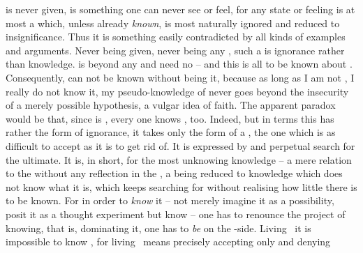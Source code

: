  is never given,  is something one can never see or feel, for
any  state or feeling is at most a  which, unless already
{\em known}, is most naturally ignored and reduced to insignificance. Thus
it is something easily contradicted by all kinds of  examples and
arguments.
Never being given, never being any  , such a  is
ignorance rather than knowledge.     is
beyond any  and need no  -- and this is all to be known
about . Consequently,  can not be known without being it,
because as long as I am not , I really do not know it, my 
pseudo-knowledge of  never goes beyond the insecurity of a merely
possible hypothesis, a vulgar idea of faith. The apparent paradox would be that,
since  is , every one knows , too.
Indeed, but in  terms this  has rather the
form of ignorance, it takes only the form of a ,
the one which is as difficult to accept as it is to get rid of. It is expressed
by  and perpetual search for the ultimate. It is, in short, for the
most unknowing knowledge -- a mere relation to the  without any
reflection in the , a being reduced to knowledge which does not
know what it is, which keeps searching for  without realising how
little there is to be known. For in order to {\em know} it -- not merely imagine
it as a possibility, posit it as a thought experiment but  know --
one has to renounce the project of  knowing, that is, dominating
it, one has to {\em be} on the \yes-side.  Living \No\ it is impossible to know
\Yes, for living \No\ means precisely accepting only  and denying
